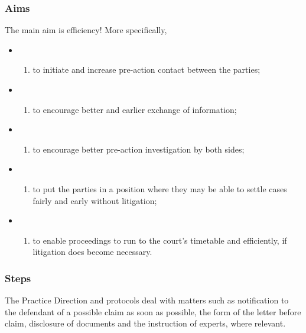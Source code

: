 \documentclass[
]{article}
\providecommand{\tightlist}{%
  \setlength{\itemsep}{0pt}\setlength{\parskip}{0pt}}
\begin{document}
\hypertarget{aims}{%
\subsubsection{Aims}\label{aims}}

The main aim is efficiency! More specifically,

\begin{itemize}
\item
  \begin{enumerate}
  \def\labelenumi{(\alph{enumi})}
  \tightlist
  \item
    to initiate and increase pre-action contact between the parties;
  \end{enumerate}
\item
  \begin{enumerate}
  \def\labelenumi{(\alph{enumi})}
  \setcounter{enumi}{1}
  \tightlist
  \item
    to encourage better and earlier exchange of information;
  \end{enumerate}
\item
  \begin{enumerate}
  \def\labelenumi{(\alph{enumi})}
  \setcounter{enumi}{2}
  \tightlist
  \item
    to encourage better pre-action investigation by both sides;
  \end{enumerate}
\item
  \begin{enumerate}
  \def\labelenumi{(\alph{enumi})}
  \setcounter{enumi}{3}
  \tightlist
  \item
    to put the parties in a position where they may be able to settle
    cases fairly and early without litigation;
  \end{enumerate}
\item
  \begin{enumerate}
  \def\labelenumi{(\alph{enumi})}
  \setcounter{enumi}{4}
  \tightlist
  \item
    to enable proceedings to run to the court's timetable and
    efficiently, if litigation does become necessary.
  \end{enumerate}
\end{itemize}

\hypertarget{steps}{%
\subsubsection{Steps}\label{steps}}

The Practice Direction and protocols deal with matters such as
notification to the defendant of a possible claim as soon as possible,
the form of the letter before claim, disclosure of documents and the
instruction of experts, where relevant.
\end{document}

